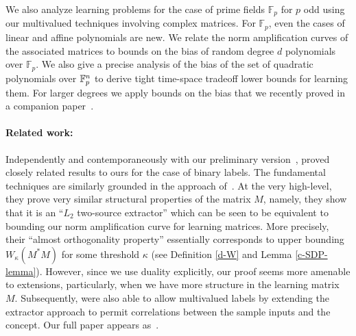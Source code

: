 
We also analyze learning problems for the case of prime fields $\mathbb{F}_p$
for $p$ odd using our multivalued techniques involving complex matrices.  
For $\mathbb{F}_p$, even the cases of linear and affine polynomials are new.
We relate the norm amplification curves of the associated matrices to bounds on
the bias of random degree $d$ polynomials over $\mathbb{F}_p$.
We also give a precise analysis of the bias of the set of quadratic
polynomials over $\mathbb{F}^n_p$ to derive tight time-space tradeoff lower
bounds for learning them.  For larger degrees we apply bounds on the bias that we
recently proved in a companion paper~\citep{bogy:reedmuller-bias}.


\begin{sloppypar}\paragraph{Related work:}
Independently and contemporaneously with our preliminary version~\citep{bogy:quadlearn-tr}, \cite{grt:extractor-learn} 
proved closely related results to ours for the case of binary labels.   
The fundamental techniques are similarly grounded in the approach 
of~\cite{DBLP:conf/focs/Raz17}.
At the very high-level, they prove very similar structural properties of the matrix $M$, namely, they show that it is an ``$L_2$ two-source extractor'' which can be seen to be equivalent to bounding our norm amplification curve for learning matrices.
More precisely, their ``almost orthogonality property'' essentially corresponds to upper bounding $W_\kappa(M^*M)$ for some threshold $\kappa$  (see Definition \ref{d-W} and Lemma \ref{c-SDP-lemma}). However, since we use duality explicitly, our proof seems more amenable to extensions, particularly, when we have more structure in the learning matrix $M$.
Subsequently, \cite{grt:extractor-learn-stoc} were also
able to allow multivalued labels by extending the extractor approach to permit 
correlations between the sample inputs and the concept.  Our full paper appears as~\cite{bogy:learning-coltfull-tr}.
\end{sloppypar}


